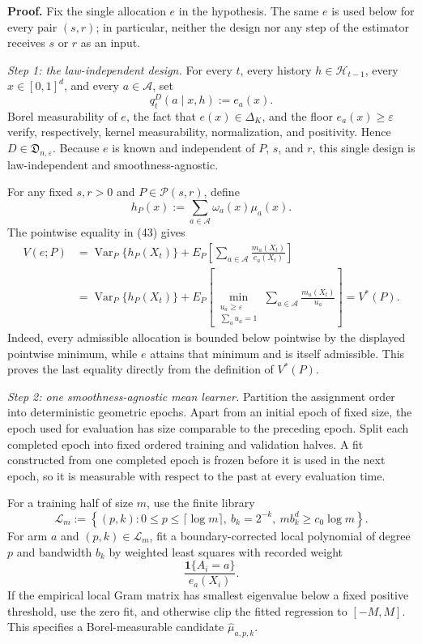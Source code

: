 \textbf{Proof.}
Fix the single allocation \(e\) in the hypothesis.  The same \(e\) is used below for every pair \((s,r)\); in particular, neither the design nor any step of the estimator receives \(s\) or \(r\) as an input.

\emph{Step 1: the law-independent design.}
For every \(t\), every history \(h\in\mathcal H_{t-1}\), every \(x\in[0,1]^d\), and every \(a\in\mathcal A\), set
\[
q_t^D(a\mid x,h):=e_a(x).
\tag{45}
\]
Borel measurability of \(e\), the fact that \(e(x)\in\Delta_K\), and the floor \(e_a(x)\geq\varepsilon\) verify, respectively, kernel measurability, normalization, and positivity.  Hence \(D\in\mathfrak D_{n,\varepsilon}\).  Because \(e\) is known and independent of \(P\), \(s\), and \(r\), this single design is law-independent and smoothness-agnostic.

For any fixed \(s,r>0\) and \(P\in\mathcal P(s,r)\), define
\[
h_P(x):=\sum_{a\in\mathcal A}\omega_a(x)\mu_a(x).
\]
The pointwise equality in (43) gives
\[
\begin{aligned}
V(e;P)
&=\operatorname{Var}_P\{h_P(X_t)\}
  +E_P\!\left[\sum_{a\in\mathcal A}\frac{m_a(X_t)}{e_a(X_t)}\right]\\
&=\operatorname{Var}_P\{h_P(X_t)\}
  +E_P\!\left[
    \min_{\substack{u_a\geq\varepsilon\\\sum_a u_a=1}}
    \sum_{a\in\mathcal A}\frac{m_a(X_t)}{u_a}
  \right]
=V^*(P).
\tag{46}
\end{aligned}
\]
Indeed, every admissible allocation is bounded below pointwise by the displayed pointwise minimum, while \(e\) attains that minimum and is itself admissible.  This proves the last equality directly from the definition of \(V^*(P)\).

\emph{Step 2: one smoothness-agnostic mean learner.}
Partition the assignment order into deterministic geometric epochs.  Apart from an initial epoch of fixed size, the epoch used for evaluation has size comparable to the preceding epoch.  Split each completed epoch into fixed ordered training and validation halves.  A fit constructed from one completed epoch is frozen before it is used in the next epoch, so it is measurable with respect to the past at every evaluation time.

For a training half of size \(m\), use the finite library
\[
\mathcal L_m
:=\left\{(p,k):0\leq p\leq\lceil\log m\rceil,
\ b_k=2^{-k},\ mb_k^d\geq c_0\log m\right\}.
\tag{47}
\]
For arm \(a\) and \((p,k)\in\mathcal L_m\), fit a boundary-corrected local polynomial of degree \(p\) and bandwidth \(b_k\) by weighted least squares with recorded weight
\[
\frac{\mathbf 1\{A_i=a\}}{e_a(X_i)}.
\]
If the empirical local Gram matrix has smallest eigenvalue below a fixed positive threshold, use the zero fit, and otherwise clip the fitted regression to \([-M,M]\).  This specifies a Borel-measurable candidate \(\widehat\mu_{a,p,k}\).

